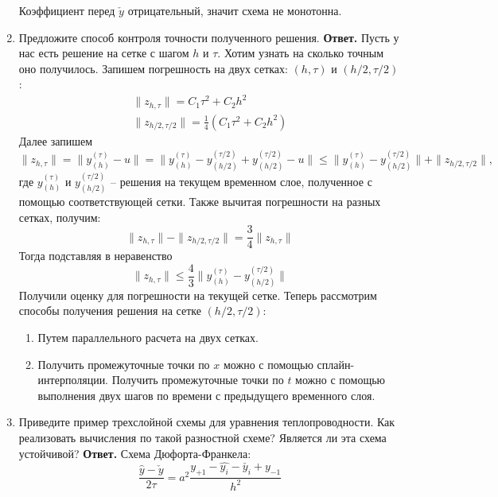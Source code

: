 \documentclass{article}
\begin{document}
\begin{enumerate}
		Коэффициент перед $\check{y}$ отрицательный, значит схема не монотонна.
		\item Предложите способ контроля точности полученного решения.
		\newline 
		{\bfseries Ответ. } 
		Пусть у нас есть решение на сетке с шагом $h$ и $\tau$.
		Хотим узнать на сколько точным оно получилось. 
		Запишем погрешность на двух сетках: $(h, \tau)$ и $(h/2, \tau/2)$:
		\begin{gather*}
			\|z_{h, \tau}\| = C_1 \tau^2 + C_2 h^2 \\ 
			\|z_{h/2, \tau/2}\| = \frac{1}{4} (C_1\tau^2 + C_2 h^2) 
		\end{gather*}
		Далее запишем 
		\begin{equation*}
			\|z_{h, \tau}\| = \|y_{(h)}^{(\tau)} - u\| = \|y_{(h)}^{(\tau)} - y_{(h/2)}^{(\tau/2)} + 
			y_{(h/2)}^{(\tau/2)} - u\| \leqslant \| y_{(h)}^{(\tau)} - y_{(h/2)}^{(\tau/2)}\| + \|z_{h/2, \tau/2}\|,
		\end{equation*}
		где $y_{(h)}^{(\tau)}$ и $y_{(h/2)}^{(\tau/2)}$ -- решения на текущем временном слое, полученное 
		с помощью соответствующей сетки.
		Также вычитая погрешности на разных сетках, получим:
		\begin{equation*}
			\|z_{h, \tau}\| - \|z_{h/2, \tau/2}\| = \frac{3}{4} \|z_{h, \tau}\|
		\end{equation*}
		Тогда подставляя в неравенство
		\begin{equation*}
			\|z_{h, \tau}\| \leqslant \frac{4}{3} \| y_{(h)}^{(\tau)} - y_{(h/2)}^{(\tau/2)}\|
		\end{equation*}
		Получили оценку для погрешности на текущей сетке. Теперь рассмотрим способы получения 
		решения на сетке $(h/2, \tau/2)$:
		\begin{enumerate}
			\item Путем параллельного расчета на двух сетках.
			\item Получить промежуточные точки по $x$ можно с помощью сплайн-интерполяции. Получить 
			 промежуточные точки по $t$ можно с помощью выполнения двух шагов по времени с предыдущего временного слоя.
		\end{enumerate}
		\item Приведите пример трехслойной схемы для уравнения теплопроводности. Как реализовать вычисления по такой разностной схеме? Является ли эта схема устойчивой?
		\newline 
		{\bfseries Ответ. } 
		Схема Дюфорта-Франкела:
		$$\frac{\hat{y}-\check{y}}{2 \tau}=a^2 \frac{y_{+1}-\hat{y_i}-\check{y_i}+y_{-1}}{h^2}$$
		

\end{enumerate}
\end{document}
